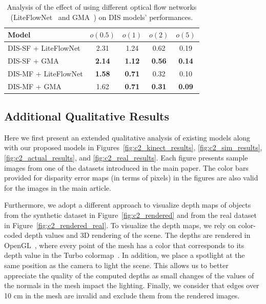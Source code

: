 \begin{table}[t]
    \begin{center}
        \begin{tabular}{lcccc}
        \hline
        Model & $o(0.5)$ & $o(1)$ & $o(2)$ & $o(5)$ \\
        \hline
        DIS-SF + LiteFlowNet & 2.31 & 1.24 & 0.62 & 0.19 \\
        DIS-SF + GMA & \textbf{2.14} & \textbf{1.12} & \textbf{0.56} & \textbf{0.14} \\
        \hline
        DIS-MF + LiteFlowNet & \textbf{1.58} & \textbf{0.71} & 0.32 & 0.10 \\
        DIS-MF + GMA & 1.62 & \textbf{0.71} & \textbf{0.31} & \textbf{0.09} \\
        \hline
        \end{tabular}
    \end{center}
    \caption{Analysis of the effect of using different optical flow networks (LiteFlowNet~\cite{hui2018liteflownet} and GMA~\cite{jiang2021learning}) on DIS models' performances.}
    \label{table:ablation_gma}
\end{table}

\subsection{Additional Qualitative Results} \label{sec:c2_additional_results}
Here we first present an extended qualitative analysis of existing models along with our proposed models in Figures~\ref{fig:c2_kinect_results}, \ref{fig:c2_sim_results}, \ref{fig:c2_actual_results}, and \ref{fig:c2_real_results}. Each figure presents sample images from one of the datasets introduced in the main paper. The color bars provided for disparity error maps (in terms of pixels) in the figures are also valid for the images in the main article.

Furthermore, we adopt a different approach to visualize depth maps of objects from the synthetic dataset in Figure~\ref{fig:c2_rendered} and from the real dataset in Figure~\ref{fig:c2_rendered_real}. To visualize the depth maps, we rely on color-coded depth values and 3D rendering of the scene. The depths are rendered in OpenGL~\cite{shreiner2013opengl}, where every point of the mesh has a color that corresponds to its depth value in the Turbo colormap~\cite{mikhailov2019turbo}. In addition, we place a spotlight at the same position as the camera to light the scene. This allows us to better appreciate the quality of the computed depths as small changes of the values of the normals in the mesh impact the lighting. Finally, we consider that edges over 10 cm in the mesh are invalid and exclude them from the rendered images.


